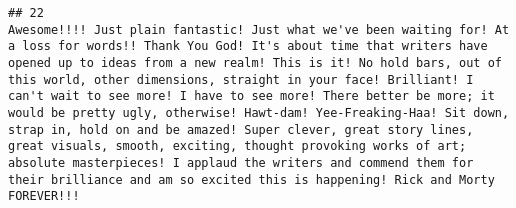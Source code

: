 \documentclass[
]{article}
\begin{document}
\begin{verbatim}
## 22                                                                                                                                                                                                                                                                                                                                                                                                                                                                                                                                                                                                                                                                                                                                                                                                                                                                                                                                                                                                                                                                                                                                                                                                                                                                                                                                                                                                                                                                                                                                                                                                                                                                                                                                 Awesome!!!! Just plain fantastic! Just what we've been waiting for! At a loss for words!! Thank You God! It's about time that writers have opened up to ideas from a new realm! This is it! No hold bars, out of this world, other dimensions, straight in your face! Brilliant! I can't wait to see more! I have to see more! There better be more; it would be pretty ugly, otherwise! Hawt-dam! Yee-Freaking-Haa! Sit down, strap in, hold on and be amazed! Super clever, great story lines, great visuals, smooth, exciting, thought provoking works of art; absolute masterpieces! I applaud the writers and commend them for their brilliance and am so excited this is happening! Rick and Morty FOREVER!!!

\end{verbatim}
\end{document}
